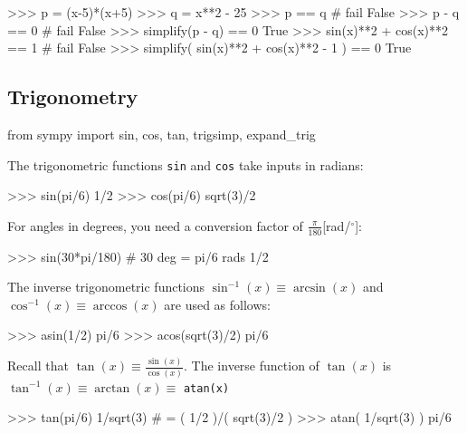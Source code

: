 \small
\begin{verbatimtab}
>>> p = (x-5)*(x+5)
>>> q = x**2 - 25
>>> p == q                                      # fail
False
>>> p - q == 0                                  # fail 
False
>>> simplify(p - q) == 0          
True
>>> sin(x)**2 + cos(x)**2  == 1                 # fail
False
>>> simplify( sin(x)**2 + cos(x)**2 - 1 ) == 0
True
\end{verbatimtab}
\normalsize


\subsection{Trigonometry}
\label{basics:trigonometry}

\small
\begin{verbatimtab}
from sympy import sin, cos, tan, trigsimp, expand_trig
\end{verbatimtab}
\normalsize

\noindent
The trigonometric functions \texttt{sin} and \texttt{cos} take inputs in radians: 					  

\small
\begin{verbatimtab}
>>> sin(pi/6)
1/2
>>> cos(pi/6)
sqrt(3)/2
\end{verbatimtab}
\normalsize

\noindent
For angles in degrees, 
you need a conversion factor of $\frac{\pi}{180}$[rad/$^\circ$]:

\small
\begin{verbatimtab}
>>> sin(30*pi/180)                 # 30 deg = pi/6 rads 
1/2
\end{verbatimtab}
\normalsize

\noindent
The inverse trigonometric functions $\sin^{-1}(x)\equiv \arcsin(x)$
and $\cos^{-1}(x)\equiv \arccos(x)$ are used as follows:

\small
\begin{verbatimtab}
>>> asin(1/2)
pi/6
>>> acos(sqrt(3)/2)
pi/6
\end{verbatimtab}
\normalsize
Recall that $\tan(x) \equiv \frac{\sin(x)}{\cos(x)}$.
The inverse function of $\tan(x)$ is $\tan^{-1}(x)\equiv \arctan(x)\equiv$ \texttt{atan(x)}



\small
\begin{verbatimtab}
>>> tan(pi/6)
1/sqrt(3)                          # = ( 1/2 )/( sqrt(3)/2 )
>>> atan( 1/sqrt(3) )
pi/6
\end{verbatimtab}
\normalsize


